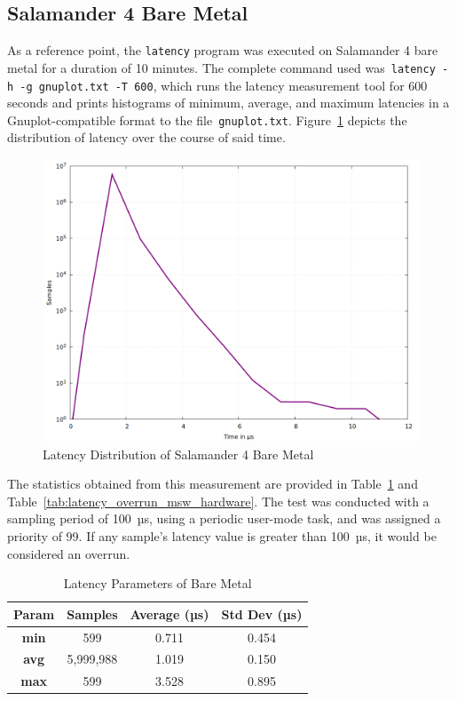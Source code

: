 \documentclass[MMR,Master,english]{style/twbook}
\begin{document}
\subsection{Salamander 4 Bare Metal}\label{subsec:salamander4-bare-metal}
As a reference point, the \texttt{latency} program was executed on Salamander 4 bare metal for a duration of 10 minutes. The complete command used was~\texttt{latency -h -g gnuplot.txt -T 600}, which runs the latency measurement tool for 600 seconds and prints histograms of minimum, average, and maximum latencies in a Gnuplot-compatible format to the file~\texttt{gnuplot.txt}. Figure~\ref{fig:gnuplot_max_latency_hardware} depicts the distribution of latency over the course of said time.

\begin{figure}[H]
	\centering
	\includegraphics[width=0.7\columnwidth]{img/implementation/gnuplot_max_latency_hardware.png}
	\caption[Latency Distribution of Salamander 4 Bare Metal]{Latency Distribution of Salamander 4 Bare Metal}
	\label{fig:gnuplot_max_latency_hardware}
\end{figure}

\noindent The statistics obtained from this measurement are provided in Table~\ref{tab:latency_stats_hardware} and Table~\ref{tab:latency_overrun_msw_hardware}. The test was conducted with a sampling period of 100~µs, using a periodic user-mode task, and was assigned a priority of 99. If any sample's latency value is greater than 100~µs, it would be considered an overrun.

\begin{table}[H]
	\centering
	\caption{Latency Parameters of Bare Metal}
	\label{tab:latency_stats_hardware}
	\begin{tabular}{|c|c|c|c|}
		\hline
		\textbf{Param} & \textbf{Samples} & \textbf{Average (µs)} & \textbf{Std Dev (µs)} \\ \hline
		\textbf{min}   & 599              & 0.711                 & 0.454                 \\ \hline
		\textbf{avg}   & 5,999,988        & 1.019                 & 0.150                 \\ \hline
		\textbf{max}   & 599              & 3.528                 & 0.895                 \\ \hline
	\end{tabular}
\end{table}
\end{document}
